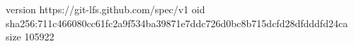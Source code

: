 version https://git-lfs.github.com/spec/v1
oid sha256:711c466080cc61fc2a9f534ba39871e7ddc726d0bc8b715dcfd28dfdddfd24ca
size 105922
